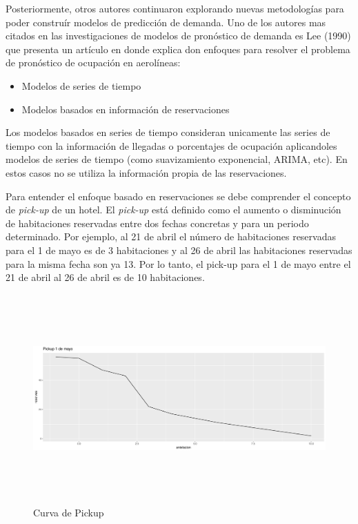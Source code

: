 {Posteriormente, otros autores continuaron explorando nuevas metodologías para poder construír modelos de predicción de demanda. Uno de los autores mas citados en las investigaciones de modelos de pronóstico de demanda es Lee (1990) que presenta un artículo en donde explica don enfoques para resolver el problema de pronóstico de ocupación en aerolíneas:
\begin{itemize}
  \item Modelos de series de tiempo 
  \item Modelos basados en información de reservaciones
\end{itemize}

Los modelos basados en series de tiempo consideran unicamente las series de tiempo con la información de llegadas o porcentajes de ocupación aplicandoles modelos de series de tiempo (como suavizamiento exponencial, ARIMA, etc). En estos casos no se utiliza la información propia de las reservaciones.


Para entender el enfoque basado en reservaciones se debe comprender el concepto de \emph{pick-up} de un hotel. El \emph{pick-up} está definido como el aumento o disminución de habitaciones reservadas entre dos fechas concretas y para un periodo determinado. Por ejemplo, al 21 de abril el número de habitaciones reservadas para el 1 de mayo es de 3 habitaciones y al 26 de abril las habitaciones reservadas para la misma fecha son ya 13.  Por lo tanto, el pick-up para el 1 de mayo entre el 21 de abril al 26 de abril es de 10 habitaciones.

\begin{figure}
  \centering
      \includegraphics[width=\maxwidth,height=8cm]{figures/pickupEjemplo.pdf} 
  \caption{Curva de Pickup}
\end{figure}

}
